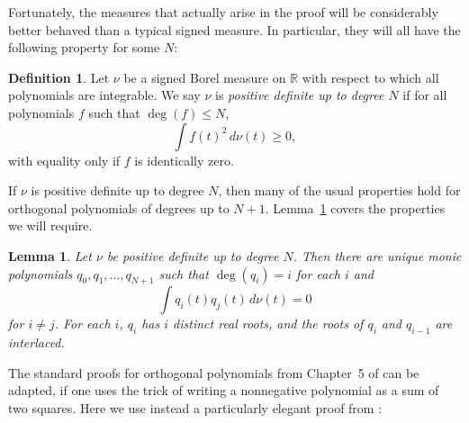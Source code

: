 \documentclass{jams-l}
\theoremstyle{plain}
\newtheorem{lemma}[theorem]{Lemma}
\numberwithin{theorem}{section}
\theoremstyle{definition}
\newtheorem{definition}[theorem]{Definition}
\numberwithin{equation}{section}
\newcommand{\R}{{\mathbb R}}
\begin{document}
Fortunately, the measures that actually arise in the proof will be
considerably better behaved than a typical signed measure.  In
particular, they will all have the following property for some
$N$:

\begin{definition}
Let $\nu$ be a signed Borel measure on $\R$ with respect to which
all polynomials are integrable. We say $\nu$ is \textit{positive
definite up to degree $N$} if for all polynomials $f$ such that
$\deg(f) \le N$,
$$
\int f(t)^2 \, d\nu(t) \ge 0,
$$
with equality only if $f$ is identically zero.
\end{definition}

If $\nu$ is positive definite up to degree $N$, then many of the
usual properties hold for orthogonal polynomials of degrees up to
$N+1$. Lemma~\ref{lemma:signed} covers the properties we will
require.

\begin{lemma}\label{lemma:signed}
Let $\nu$ be positive definite up to degree $N$.  Then there are
unique monic polynomials $q_0,q_1,\dots,q_{N+1}$ such that
$\deg(q_i)=i$ for each $i$ and
$$
\int q_i(t) q_j(t) \, d\nu(t) = 0
$$
for $i\ne j$.  For each $i$, $q_i$ has $i$ distinct real roots,
and the roots of $q_i$ and $q_{i-1}$ are interlaced.
\end{lemma}

The standard proofs for orthogonal polynomials from Chapter~5 of
\cite{AAR} can be adapted, if one uses the trick of writing a
nonnegative polynomial as a sum of two squares.  Here we use
instead a particularly elegant proof from \cite[p.~14]{Si}:
\end{document}
